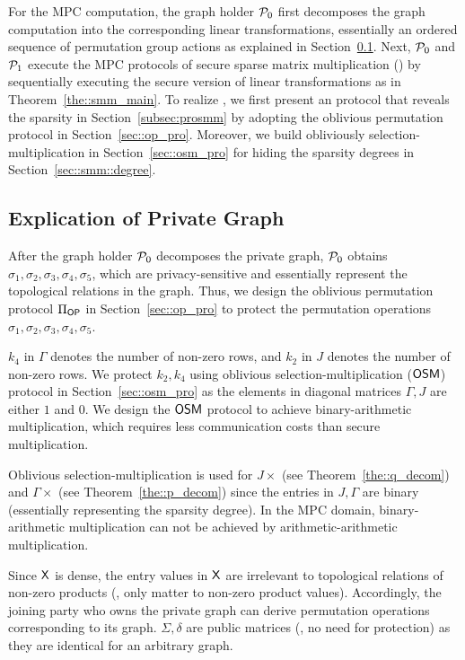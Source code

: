 \iffalse
For the MPC computation, the graph holder $\mathcal{P}_0$ first decomposes the graph computation into the corresponding linear transformations, essentially an ordered sequence of permutation group actions as explained in Section~\ref{sec::priv_graph}.
Next, $\mathcal{P}_0$ and $\mathcal{P}_1$ execute the MPC protocols of secure sparse matrix multiplication (\osmm) by sequentially executing the secure version of linear transformations as in Theorem~\ref{the::smm_main}.
To realize \osmm, we first present an \osmm protocol that reveals the sparsity in Section~\ref{subsec:prosmm} by adopting the oblivious permutation protocol in Section~\ref{sec::op_pro}.
Moreover, we build obliviously selection-multiplication in Section~\ref{sec::osm_pro} for hiding the sparsity degrees in Section~\ref{sec::smm::degree}.

\subsection{Explication of Private Graph}
\label{sec::priv_graph}

After the graph holder $\mathcal{P}_0$ decomposes the private graph, $\mathcal{P}_0$ obtains $\sigma_1, \sigma_2, \sigma_3, \sigma_4, \sigma_5$, which are privacy-sensitive and essentially represent the topological relations in the graph.
Thus, we design the oblivious permutation protocol $\Pi_{\mathsf{OP}}$ in Section~\ref{sec::op_pro} to protect the permutation operations $\sigma_1, \sigma_2, \sigma_3, \sigma_4, \sigma_5$.

$k_4$ in $\Gamma$ denotes the number of non-zero rows, and $k_2$ in $J$ denotes the number of non-zero rows.
We protect $k_2,k_4$ using oblivious selection-multiplication ($\mathsf{OSM}$) protocol in Section~\ref{sec::osm_pro} as the elements in diagonal matrices $\Gamma,J$ are either $1$ and $0$.
We design the $\mathsf{OSM}$ protocol to achieve binary-arithmetic multiplication, which requires less communication costs than secure multiplication.

 Oblivious selection-multiplication is used for $J \times$ (see Theorem~\ref{the::q_decom}) and $\Gamma \times$ (see Theorem~\ref{the::p_decom}) since the entries in $J, \Gamma$ are binary (essentially representing the sparsity degree).
In the MPC domain, binary-arithmetic multiplication can not be achieved by arithmetic-arithmetic multiplication.


Since $\mathsf{X}$ is dense, the entry values in $\mathsf{X}$ are irrelevant to topological relations of non-zero products (\ie, only matter to non-zero product values).
Accordingly, the joining party who owns the private graph can derive permutation operations corresponding to its graph.
$\Sigma, \delta$ are public matrices (\ie, no need for protection) as they are identical for an arbitrary graph.

